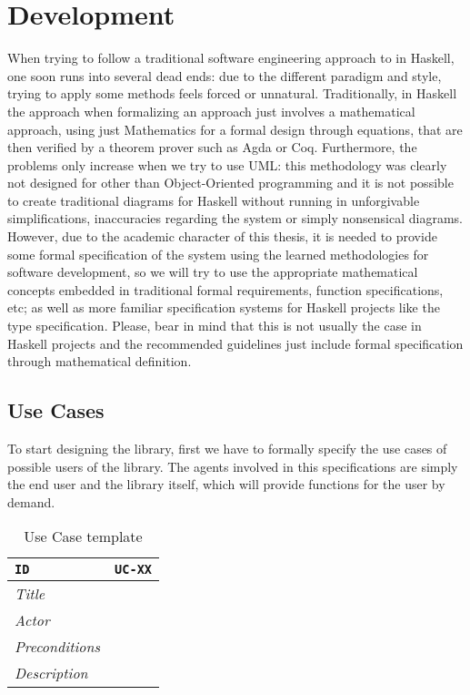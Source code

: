 \section{Development}

When trying to follow a traditional software engineering approach to in
Haskell, one soon runs into several dead ends: due to the different paradigm
and style, trying to apply some methods feels forced or unnatural.
Traditionally, in Haskell the approach when formalizing an approach just
involves a mathematical approach, using just Mathematics for a formal design
through equations, that are then verified by a theorem prover such as Agda or
Coq. Furthermore, the problems only increase when we try to use UML: this
methodology was clearly not designed for other than Object-Oriented programming
and it is not possible to create traditional diagrams for Haskell without
running in unforgivable simplifications, inaccuracies regarding the system or
simply nonsensical diagrams. \\

However, due to the academic character of this thesis, it is needed to provide
some formal specification of the system using the learned methodologies for
software development, so we will try to use the appropriate mathematical
concepts embedded in traditional formal requirements, function specifications,
etc; as well as more familiar specification systems for Haskell projects like
the type specification. Please, bear in mind that this is not usually the case
in Haskell projects and the recommended guidelines just include formal
specification through mathematical definition. \\

\subsection{Use Cases}

To start designing the library, first we have to formally specify the use cases
of possible users of the library. The agents involved in this specifications
are simply the end user and the library itself, which will provide functions
for the user by demand.\\

\begin{table}[h]
  \centering
\begin{tabular}{| p{4cm} | p{6cm} |}
  \hline
  \texttt{ID}            & \texttt{UC-XX} \\
  \hline
  \textit{Title}         & \\
  \textit{Actor}         & \\
  \textit{Preconditions} & \\
  \textit{Description}   & \\
  \hline
\end{tabular}
\caption{Use Case template}
\label{table:uc-ex}
\end{table}

